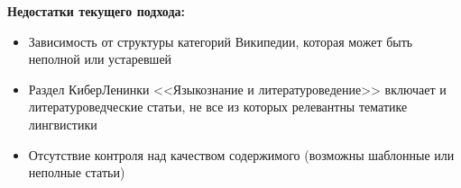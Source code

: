 \textbf{Недостатки текущего подхода:}
\begin{itemize}
    \item Зависимость от структуры категорий Википедии, которая может быть неполной или устаревшей
    \item Раздел КиберЛенинки <<Языкознание и литературоведение>> включает и литературоведческие статьи, не все из которых релевантны тематике лингвистики
    \item Отсутствие контроля над качеством содержимого (возможны шаблонные или неполные статьи)
\end{itemize}

\pagebreak
